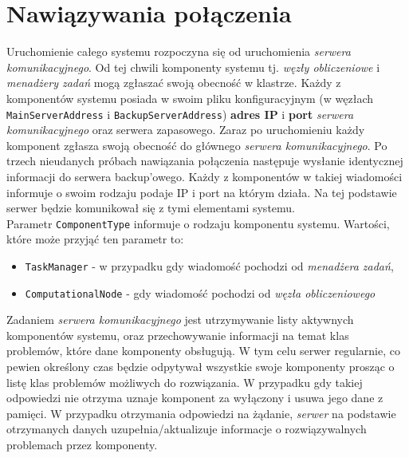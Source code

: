 \documentclass[12pt,a4paper,titlepage]{report}
\begin{document}
		\section{Nawiązywania połączenia}
	Uruchomienie całego systemu rozpoczyna się od uruchomienia \textit{serwera komunikacyjnego}. Od tej chwili komponenty systemu tj. 
	\textit{węzły obliczeniowe}	i \textit{menadżery zadań} mogą zgłaszać swoją obecność w klastrze. Każdy z komponentów systemu 
	posiada w swoim pliku konfiguracyjnym (w węzłach \verb+MainServerAddress+ i \verb+BackupServerAddress+) \textbf{adres IP} i
	 \textbf{port} \textit{serwera komunikacyjnego} oraz serwera zapasowego. Zaraz po uruchomieniu każdy komponent
	zgłasza swoją obecność do głównego \textit{serwera komunikacyjnego}. Po trzech nieudanych próbach nawiązania połączenia następuje
	wysłanie identycznej informacji do serwera backup'owego. Każdy z komponentów w takiej wiadomości informuje o swoim rodzaju podaje
	IP i port na którym	działa. Na tej podstawie serwer będzie komunikował się z tymi elementami systemu.\\
	
		  
		
	Parametr \verb+ComponentType+ informuje o rodzaju komponentu systemu. Wartości, które może przyjąć ten parametr to:
	\begin{itemize}
		\item \verb+TaskManager+ - w przypadku gdy wiadomość pochodzi od \textit{menadżera zadań},
		\item \verb+ComputationalNode+ - gdy wiadomość pochodzi od \textit{węzła obliczeniowego}
	\end{itemize} 

	Zadaniem \textit{serwera komunikacyjnego} jest utrzymywanie listy aktywnych komponentów systemu, oraz przechowywanie informacji
	na temat klas problemów, które dane komponenty obsługują. W tym celu serwer regularnie, co pewien określony czas
	będzie odpytywał wszystkie swoje komponenty prosząc o listę klas problemów możliwych do rozwiązania. W przypadku gdy takiej
	odpowiedzi nie otrzyma uznaje komponent za wyłączony i usuwa jego dane z pamięci. W przypadku otrzymania odpowiedzi na
	żądanie, \textit{serwer} na podstawie otrzymanych danych uzupełnia/aktualizuje informacje o rozwiązywalnych problemach
	przez komponenty.\\
	
		 
\end{document}
